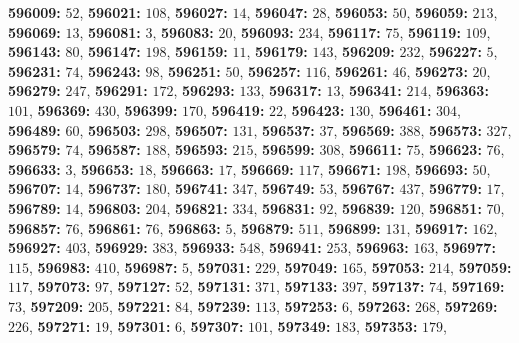 \textsf{\bfseries 596009:} $52$, \textsf{\bfseries 596021:} $108$, \textsf{\bfseries 596027:} $14$, \textsf{\bfseries 596047:} $28$, \textsf{\bfseries 596053:} $50$, \textsf{\bfseries 596059:} $213$, \textsf{\bfseries 596069:} $13$, \textsf{\bfseries 596081:} $3$, \textsf{\bfseries 596083:} $20$, \textsf{\bfseries 596093:} $234$, \textsf{\bfseries 596117:} $75$, \textsf{\bfseries 596119:} $109$, \textsf{\bfseries 596143:} $80$, \textsf{\bfseries 596147:} $198$, \textsf{\bfseries 596159:} $11$, \textsf{\bfseries 596179:} $143$, \textsf{\bfseries 596209:} $232$, \textsf{\bfseries 596227:} $5$, \textsf{\bfseries 596231:} $74$, \textsf{\bfseries 596243:} $98$, \textsf{\bfseries 596251:} $50$, \textsf{\bfseries 596257:} $116$, \textsf{\bfseries 596261:} $46$, \textsf{\bfseries 596273:} $20$, \textsf{\bfseries 596279:} $247$, \textsf{\bfseries 596291:} $172$, \textsf{\bfseries 596293:} $133$, \textsf{\bfseries 596317:} $13$, \textsf{\bfseries 596341:} $214$, \textsf{\bfseries 596363:} $101$, \textsf{\bfseries 596369:} $430$, \textsf{\bfseries 596399:} $170$, \textsf{\bfseries 596419:} $22$, \textsf{\bfseries 596423:} $130$, \textsf{\bfseries 596461:} $304$, \textsf{\bfseries 596489:} $60$, \textsf{\bfseries 596503:} $298$, \textsf{\bfseries 596507:} $131$, \textsf{\bfseries 596537:} $37$, \textsf{\bfseries 596569:} $388$, \textsf{\bfseries 596573:} $327$, \textsf{\bfseries 596579:} $74$, \textsf{\bfseries 596587:} $188$, \textsf{\bfseries 596593:} $215$, \textsf{\bfseries 596599:} $308$, \textsf{\bfseries 596611:} $75$, \textsf{\bfseries 596623:} $76$, \textsf{\bfseries 596633:} $3$, \textsf{\bfseries 596653:} $18$, \textsf{\bfseries 596663:} $17$, \textsf{\bfseries 596669:} $117$, \textsf{\bfseries 596671:} $198$, \textsf{\bfseries 596693:} $50$, \textsf{\bfseries 596707:} $14$, \textsf{\bfseries 596737:} $180$, \textsf{\bfseries 596741:} $347$, \textsf{\bfseries 596749:} $53$, \textsf{\bfseries 596767:} $437$, \textsf{\bfseries 596779:} $17$, \textsf{\bfseries 596789:} $14$, \textsf{\bfseries 596803:} $204$, \textsf{\bfseries 596821:} $334$, \textsf{\bfseries 596831:} $92$, \textsf{\bfseries 596839:} $120$, \textsf{\bfseries 596851:} $70$, \textsf{\bfseries 596857:} $76$, \textsf{\bfseries 596861:} $76$, \textsf{\bfseries 596863:} $5$, \textsf{\bfseries 596879:} $511$, \textsf{\bfseries 596899:} $131$, \textsf{\bfseries 596917:} $162$, \textsf{\bfseries 596927:} $403$, \textsf{\bfseries 596929:} $383$, \textsf{\bfseries 596933:} $548$, \textsf{\bfseries 596941:} $253$, \textsf{\bfseries 596963:} $163$, \textsf{\bfseries 596977:} $115$, \textsf{\bfseries 596983:} $410$, \textsf{\bfseries 596987:} $5$, \textsf{\bfseries 597031:} $229$, \textsf{\bfseries 597049:} $165$, \textsf{\bfseries 597053:} $214$, \textsf{\bfseries 597059:} $117$, \textsf{\bfseries 597073:} $97$, \textsf{\bfseries 597127:} $52$, \textsf{\bfseries 597131:} $371$, \textsf{\bfseries 597133:} $397$, \textsf{\bfseries 597137:} $74$, \textsf{\bfseries 597169:} $73$, \textsf{\bfseries 597209:} $205$, \textsf{\bfseries 597221:} $84$, \textsf{\bfseries 597239:} $113$, \textsf{\bfseries 597253:} $6$, \textsf{\bfseries 597263:} $268$, \textsf{\bfseries 597269:} $226$, \textsf{\bfseries 597271:} $19$, \textsf{\bfseries 597301:} $6$, \textsf{\bfseries 597307:} $101$, \textsf{\bfseries 597349:} $183$, \textsf{\bfseries 597353:} $179$, 
